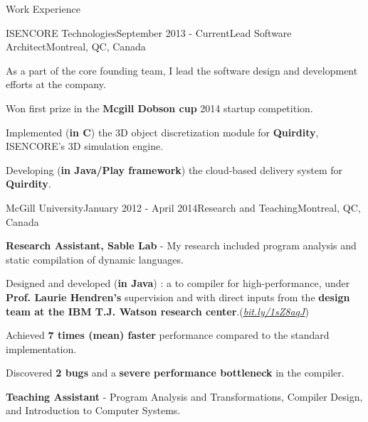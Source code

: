 \documentclass{resume} %
\begin{document}
\begin{rSection}{Work Experience}

\begin{rSubsection}{ISENCORE Technologies}{September 2013 - Current}{Lead
  Software Architect}{Montreal, QC, Canada}
\item As a part of the core founding team, I lead the software design and development efforts at the company.

\begin{lsubSubsection}
\item Won first prize in the \textbf{Mcgill Dobson cup} 2014 startup competition. 
\item Implemented (\textbf{in C}) the 3D object discretization module for \textbf{Quirdity},
  ISENCORE's 3D simulation engine.
\item Developing (\textbf{in Java/Play framework}) the cloud-based delivery system for \textbf{Quirdity}.
\end{lsubSubsection}
\end{rSubsection}

\begin{rSubsection}{McGill University}{January 2012 - April 2014}{Research and
Teaching}{Montreal, QC, Canada} 
\item \textbf{Research Assistant, Sable Lab} - My research included program
analysis and static compilation of dynamic languages.

\begin{lsubSubsection}
  \item Designed and developed (\textbf{in Java}) \mixtenx: a {\matlab to
\xten compiler for high-performance}, under \textbf{Prof.
Laurie Hendren's} supervision and with direct inputs from the \textbf{\xten
design team at the IBM T.J. Watson research
center}.(\href{http://bit.ly/1sZ8aqJ}{\em{bit.ly/1sZ8aqJ}})  
 \item Achieved \textbf{7 times (mean) faster} performance compared to the
 standard \matlab implementation.
  \item Discovered \textbf{2 bugs} and a \textbf{severe performance bottleneck}
in the \xten compiler.  
\end{lsubSubsection}
\item \textbf{Teaching Assistant} - Program Analysis and Transformations,
	Compiler Design, and Introduction to Computer Systems.
\end{rSubsection}


\end{rSection}
\end{document}
